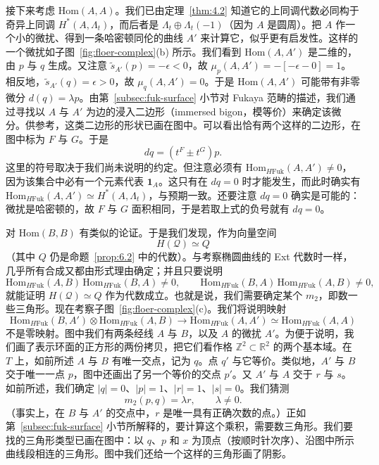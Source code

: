 接下来考虑 $\mathrm{Hom}(A,A)$。我们已由定理~\ref{thm:4.2} 知道它的上同调代数必同构于奇异上同调 $H^*(A,\Lambda_t)$，而后者是 $\Lambda_t\oplus\Lambda_t(-1)$（因为 $A$ 是圆周）。把 $A$ 作一个小的微扰、得到一条哈密顿同伦的曲线 $A'$ 来计算它，似乎更有启发性。这样的一个微扰如子图~\ref{fig:floer-complex}(b) 所示。我们看到 $\mathrm{Hom}(A,A')$ 是二维的，由 $p$ 与 $q$ 生成。又注意 $\tilde{s}_{A'}(p)=-\epsilon<0$，故 $\mu_p(A,A')=-[-\epsilon-0]=1$。相反地，$\tilde{s}_{A'}(q)=\epsilon>0$，故 $\mu_q(A,A')=0$。于是 $\mathrm{Hom}(A,A')$ 可能带有非零微分 $d(q)=\lambda p$。由第~\ref{subsec:fuk-surface} 小节对 Fukaya 范畴的描述，我们通过寻找以 $A$ 与 $A'$ 为边的浸入二边形（immersed bigon，模等价）来确定该微分。供参考，这类二边形的形状已画在图中。可以看出恰有两个这样的二边形，在图中标为 $F$ 与 $G$。于是
\[
dq=(t^F\pm t^G)p.
\]
这里的符号取决于我们尚未说明的约定。但注意必须有 $\mathrm{Hom}_{H\mathrm{Fuk}}(A,A')\neq0$，因为该集合中必有一个元素代表 $\mathbf{1}_A$。这只有在 $dq=0$ 时才能发生，而此时确实有 $\mathrm{Hom}_{H\mathrm{Fuk}}(A,A')\simeq H^*(A,\Lambda_t)$，与预期一致。还要注意 $dq=0$ 确实是可能的：微扰是哈密顿的，故 $F$ 与 $G$ 面积相同，于是若取上式的负号就有 $dq=0$。


对 $\mathrm{Hom}(B,B)$ 有类似的论证。于是我们发现，作为向量空间
\[
H(\mathcal{Q})\simeq Q
\]
（其中 $Q$ 仍是命题~\ref{prop:6.2} 中的代数）。与考察椭圆曲线的 Ext 代数时一样，几乎所有合成又都由形式理由确定；并且只要说明
\[
\mathrm{Hom}_{H\mathrm{Fuk}}(A,B)\,\mathrm{Hom}_{H\mathrm{Fuk}}(B,A)\neq0,
\qquad
\mathrm{Hom}_{H\mathrm{Fuk}}(B,A)\,\mathrm{Hom}_{H\mathrm{Fuk}}(A,B)\neq0,
\]
就能证明 $H(\mathcal{Q})\simeq Q$ 作为代数成立。也就是说，我们需要确定某个 $m_2$，即数一些三角形。现在考察子图~\ref{fig:floer-complex}(c)。我们将说明映射
\[
\mathrm{Hom}_{H\mathrm{Fuk}}(B,A')\otimes\mathrm{Hom}_{H\mathrm{Fuk}}(A,B)\longrightarrow
\mathrm{Hom}_{H\mathrm{Fuk}}(A,A')\simeq\mathrm{Hom}_{H\mathrm{Fuk}}(A,A)
\]
不是零映射。图中我们有两条经线 $A$ 与 $B$，以及 $A$ 的微扰 $A'$。为便于说明，我们画了表示环面的正方形的两份拷贝，把它们看作格 $\mathbb{Z}^2\subset\mathbb{R}^2$ 的两个基本域。在 $T$ 上，如前所述 $A$ 与 $B$ 有唯一交点，记为 $q$。点 $q'$ 与它等价。类似地，$A'$ 与 $B$ 交于唯一一点 $p$，图中还画出了另一个等价的交点 $p'$。又 $A'$ 与 $A$ 交于 $r$ 与 $s$。如前所述，我们确定 $|q|=0$、$|p|=1$、$|r|=1$、$|s|=0$。我们猜测
\[
m_2(p,q)=\lambda r,\qquad \lambda\neq0.
\]
（事实上，在 $B$ 与 $A'$ 的交点中，$r$ 是唯一具有正确次数的点。）正如第~\ref{subsec:fuk-surface} 小节所解释的，要计算这个乘积，需要数三角形。我们要找的三角形类型已画在图中：以 $q$、$p$ 和 $x$ 为顶点（按顺时针次序）、沿图中所示曲线段相连的三角形。图中我们还给一个这样的三角形画了阴影。

